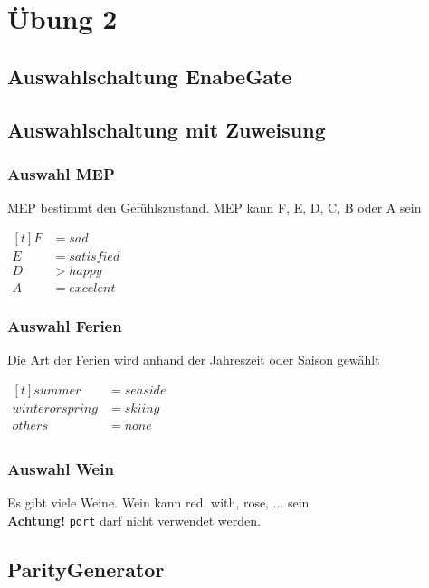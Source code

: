 \section{Übung 2}
\subsection{Auswahlschaltung EnabeGate}

\subsection{Auswahlschaltung mit Zuweisung}
\subsubsection{Auswahl MEP}
MEP bestimmt den Gefühlszustand.
MEP kann F, E, D, C, B oder A sein

$\begin{aligned}[t]
    F &= sad \\
    E &= satisfied\\
    D &> happy \\
    A &= excelent
\end{aligned}$


\subsubsection{Auswahl Ferien}
Die Art der Ferien wird anhand der Jahreszeit oder Saison gewählt
 
$\begin{aligned}[t]
    summer &= seaside \\
    winter or spring &= skiing\\
    others &= none \\
\end{aligned}$


\subsubsection{Auswahl Wein}
Es gibt viele Weine.
Wein kann  red, with, rose, ... sein\\
\textbf{Achtung!} \verb?port? darf nicht verwendet werden. 
 


\subsection{ParityGenerator}



